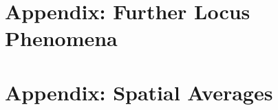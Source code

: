 \documentclass{svjour3}
\begin{document}


\appendix
\section{Appendix: Further Locus Phenomena}
\label{sec:locus-phenomena}


\section{Appendix: Spatial Averages}
\label{sec:space-averages}




\end{document}
